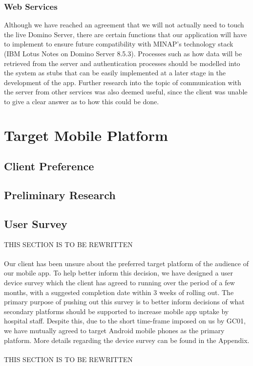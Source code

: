 \documentclass[12pt,a4paper,oneside,titlepage]{article}
\begin{document}
\subsubsection{Web Services}
Although we have reached an agreement that we will not actually need to touch the live Domino Server, there are certain functions that our application will have to implement to ensure future compatibility with MINAP's technology stack (IBM Lotus Notes on Domino Server 8.5.3). Processes such as how data will be retrieved from the server and authentication processes should be modelled into the system as stubs that can be easily implemented at a later stage in the development of the app. Further research into the topic of communication with the server from other services was also deemed useful, since the client was unable to give a clear answer as to how this could be done.

\newpage
\section{Target Mobile Platform}
\subsection{Client Preference}
\subsection{Preliminary Research}
\subsection{User Survey}
THIS SECTION IS TO BE REWRITTEN
\\ \\
Our client has been unsure about the preferred target platform of the audience of our mobile app. To help better inform this decision, we have designed a user device survey which the client has agreed to running over the period of a few months, with a suggested completion date within 3 weeks of rolling out. The primary purpose of pushing out this survey is to better inform decisions of what secondary platforms should be supported to increase mobile app uptake by hospital staff. Despite this, due to the short time-frame imposed on us by GC01, we have mutually agreed to target Android mobile phones as the primary platform. More details regarding the device survey can be found in the Appendix.
\\ \\
THIS SECTION IS TO BE REWRITTEN
\end{document}
